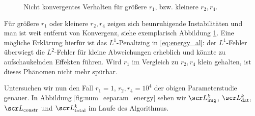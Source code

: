 \documentclass{mythesis}
\begin{document}
\begin{figure}[ht]
    \centering
    \caption{Nicht konvergentes Verhalten für größere $r_1$, bzw. kleinere $r_2, r_4$.}
    \label{fig:num_eeparam_instab}
\end{figure}

Für größere $r_1$ oder kleinere $r_2, r_4$ zeigen sich beunruhigende Instabilitäten und man ist weit entfernt von Konvergenz, siehe exemplarisch Abbildung \ref{fig:num_eeparam_instab}.
Eine mögliche Erklärung hierfür ist das $L^1$-Penalizing in \eqref{eq:energy_al}: der $L^1$-Fehler überwiegt die $L^2$-Fehler für kleine Abweichungen erheblich und könnte zu aufschaukelnden Effekten führen.
Wird $r_1$ im Vergleich zu $r_2, r_4$ klein gehalten, ist dieses Phänomen nicht mehr spürbar.

Untersuchen wir nun den Fall $r_1 = 1$, $r_2, r_4 = 10^4$ der obigen Parameterstudie genauer.
In Abbildung \ref{fig:num_eeparam_energy} sehen wir $\scr L_{\mathrm{img}}^k$, $\scr L_{\mathrm{dat}}^k$, $\scr L_{\mathrm{constr}}$ und $\scr L_{\mathrm{total}}^k$ im Laufe des Algorithmus.
\end{document}
